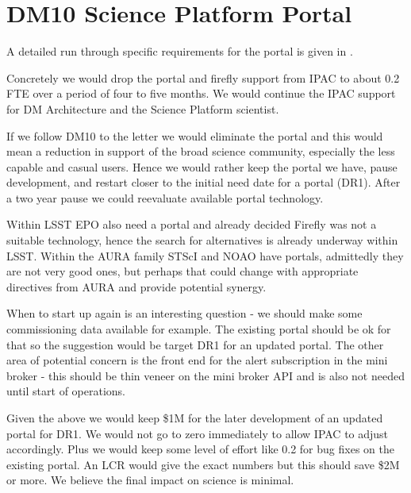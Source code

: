 \section{DM10  Science Platform Portal }\label{sect:dm10}

A detailed run through specific requirements for the portal is given in .

Concretely we would drop the portal and firefly support from  IPAC  to about 0.2 FTE over a period of four to five months.
We would continue the IPAC support for DM Architecture and the Science Platform scientist.

If we follow DM10 to the letter
we would eliminate the portal and this would mean a reduction in support of the broad science community, especially the less capable and casual users.
Hence we would rather keep the portal we have, pause development, and restart closer to the initial need date for a portal (DR1).
After a two year pause we could reevaluate available portal technology.

Within LSST EPO also need a portal and already decided Firefly was not a suitable technology, hence the search for alternatives is already underway within LSST.
Within the AURA family STScI and NOAO have portals, admittedly they are not very good ones, but perhaps that could  change with appropriate directives from AURA and provide potential synergy.

When to start up again is an interesting question - we should make some commissioning data available for example. The existing portal should be ok for that so the suggestion would be target DR1 for an updated portal.  The other area of potential concern is the front end for the alert subscription in the mini broker - this should be  thin veneer on the mini broker API and is also not needed until start of operations.

Given the above  we would keep \$1M for the later development of an updated portal for DR1. We would not go to zero immediately to allow IPAC to adjust accordingly. Plus we would keep some level of effort like 0.2 for bug fixes on the existing portal. An LCR would give the exact numbers but this should save \$2M or more. We believe the final impact on science is minimal.

